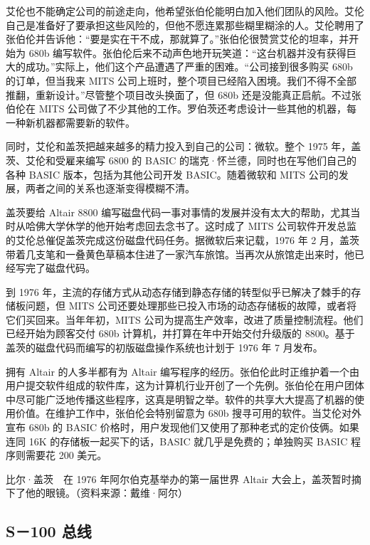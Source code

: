 \documentclass[12pt,UTF8]{ctexbook}
\begin{document}
艾伦也不能确定公司的前途走向，他希望张伯伦能明白加入他们团队的风险。艾伦自己是准备好了要承担这些风险的，但他不愿连累那些糊里糊涂的人。艾伦聘用了张伯伦并告诉他：“要是实在干不成，那就算了。”张伯伦很赞赏艾伦的坦率，并开始为 680b 编写软件。张伯伦后来不动声色地开玩笑道：“这台机器并没有获得巨大的成功。”实际上，他们这个产品遭遇了严重的困难。“公司接到很多购买 680b 的订单，但当我来 MITS 公司上班时，整个项目已经陷入困境。我们不得不全部推翻，重新设计。”尽管整个项目改头换面了，但 680b 还是没能真正启航。不过张伯伦在 MITS 公司做了不少其他的工作。罗伯茨还考虑设计一些其他的机器，每一种新机器都需要新的软件。

同时，艾伦和盖茨把越来越多的精力投入到自己的公司：微软。整个 1975 年，盖茨、艾伦和受雇来编写 6800 的 BASIC 的瑞克·怀兰德，同时也在写他们自己的各种 BASIC 版本，包括为其他公司开发 BASIC。随着微软和 MITS 公司的发展，两者之间的关系也逐渐变得模糊不清。

盖茨要给 Altair 8800 编写磁盘代码一事对事情的发展并没有太大的帮助，尤其当时从哈佛大学休学的他开始考虑回去念书了。这时成了 MITS 公司软件开发总监的艾伦总催促盖茨完成这份磁盘代码任务。据微软后来记载，1976 年 2 月，盖茨带着几支笔和一叠黄色草稿本住进了一家汽车旅馆。当再次从旅馆走出来时，他已经写完了磁盘代码。

到 1976 年，主流的存储方式从动态存储到静态存储的转型似乎已解决了棘手的存储板问题，但 MITS 公司还要处理那些已投入市场的动态存储板的故障，或者将它们买回来。当年年初，MITS 公司为提高生产效率，改进了质量控制流程。他们已经开始为顾客交付 680b 计算机，并打算在年中开始交付升级版的 8800。基于盖茨的磁盘代码而编写的初版磁盘操作系统也计划于 1976 年 7 月发布。

拥有 Altair 的人多半都有为 Altair 编写程序的经历。张伯伦此时正维护着一个由用户提交软件组成的软件库，这为计算机行业开创了一个先例。张伯伦在用户团体中尽可能广泛地传播这些程序，这真是明智之举。软件的共享大大提高了机器的使用价值。在维护工作中，张伯伦会特别留意为 680b 搜寻可用的软件。当艾伦对外宣布 680b 的 BASIC 价格时，用户发现他们又使用了那种老式的定价伎俩。如果连同 16K 的存储板一起买下的话，BASIC 就几乎是免费的；单独购买 BASIC 程序则需要花 200 美元。



比尔·盖茨　在 1976 年阿尔伯克基举办的第一届世界 Altair 大会上，盖茨暂时摘下了他的眼镜。（资料来源：戴维·阿尔）





\subsection{S－100 总线}
\end{document}
